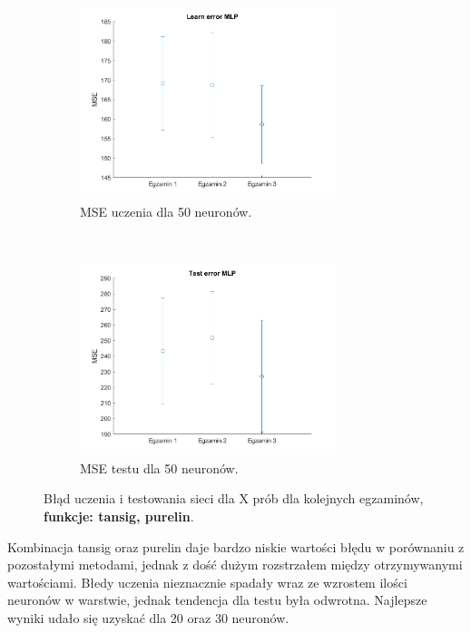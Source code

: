 \documentclass[12pt]{article}
\begin{document}
\begin{figure}[H]
\begin{subfigure}[t]{0.48\textwidth} 
\centering
\includegraphics[height=2.2in]{tansig_purelin50_learn.png}
\caption{MSE uczenia dla 50 neuronów.}
\end{subfigure}
~~
\begin{subfigure}[t]{0.48\textwidth} 
\centering
\includegraphics[height=2.2in]{tansig_purelin50_test.png}
\caption{MSE testu dla 50 neuronów.}
\end{subfigure}

\caption{Błąd uczenia i testowania sieci dla X prób dla kolejnych egzaminów, \textbf{funkcje: tansig, purelin}.}
\end{figure}


Kombinacja tansig oraz purelin daje bardzo niskie wartości błędu w porównaniu z pozostałymi metodami, jednak z dość dużym rozstrzałem między otrzymywanymi wartościami. Błedy uczenia nieznacznie spadały wraz ze wzrostem ilości neuronów w warstwie, jednak tendencja dla testu była odwrotna. Najlepsze wyniki udało się uzyskać dla 20 oraz 30 neuronów.
\end{document}

